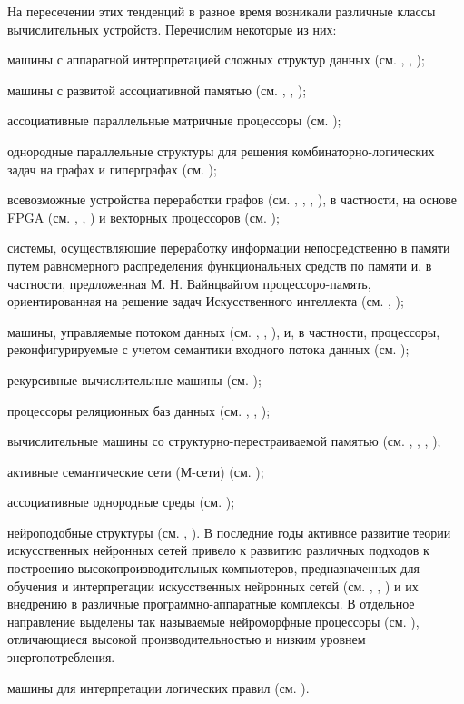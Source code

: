 На пересечении этих тенденций в разное время возникали различные классы вычислительных устройств. Перечислим некоторые из них:
\begin{textitemize}
\item машины с аппаратной интерпретацией сложных структур данных (см. , , );
\item машины с развитой ассоциативной памятью (см. , , );
\item ассоциативные параллельные матричные процессоры (см. );
\item однородные параллельные структуры для решения комбинаторно-логических задач на графах и гиперграфах (см. );
\item всевозможные устройства переработки графов (см. , , , ), в частности, на основе FPGA (см. , , ) и векторных процессоров (см. );
\item системы, осуществляющие переработку информации непосредственно в памяти путем равномерного распределения функциональных средств по памяти и, в частности, предложенная М. Н. Вайнцвайгом процессоро-память, ориентированная на решение задач Искусственного интеллекта (см. , );
\item машины, управляемые потоком данных (см. , , ), и, в частности, процессоры, реконфигурируемые с учетом семантики входного потока данных (см. );
\item рекурсивные вычислительные машины (см. );
\item процессоры реляционных баз данных (см. , , );
\item вычислительные машины со структурно-перестраиваемой памятью (см. , , , );
\item активные семантические сети (М-сети) (см. );
\item ассоциативные однородные среды (см. );
\item нейроподобные структуры (см. , ). В последние годы активное развитие теории искусственных нейронных сетей привело к развитию различных подходов к построению высокопроизводительных компьютеров, предназначенных для обучения и интерпретации искусственных нейронных сетей (см. , , ) и их внедрению в различные программно-аппаратные комплексы. В отдельное направление выделены так называемые нейроморфные процессоры (см. ), отличающиеся высокой производительностью и низким уровнем энергопотребления.
\item машины для интерпретации логических правил (см. ).
\end{textitemize}

